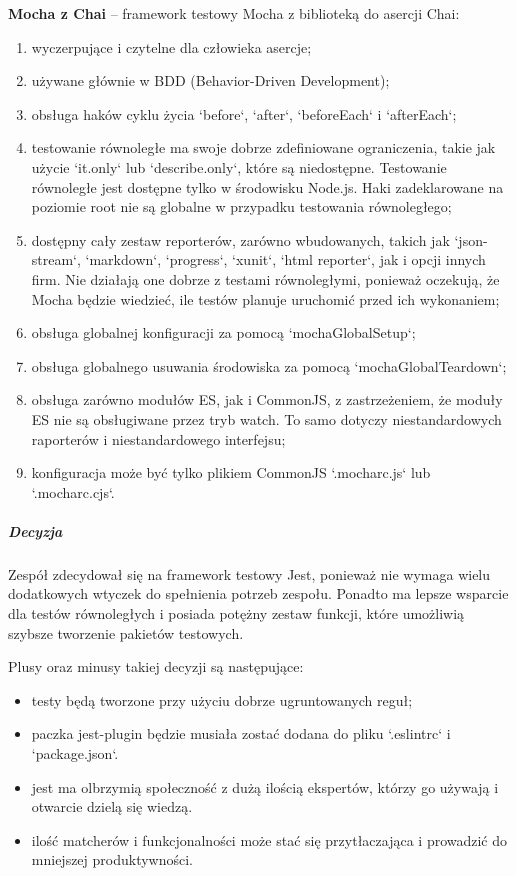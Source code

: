 \documentclass[12pt, a4paper, twoside, openany]{book}
\begin{document}
\textbf{Mocha z Chai} -- framework testowy Mocha z biblioteką do asercji Chai:
\begin{enumerate}[label=--]
    \item wyczerpujące i czytelne dla człowieka asercje;
    \item używane głównie w BDD (Behavior-Driven Development);
    \item obsługa haków cyklu życia `before`, `after`, `beforeEach` i `afterEach`;
    \item testowanie równoległe ma swoje dobrze zdefiniowane ograniczenia, takie jak użycie `it.only` lub `describe.only`, które są niedostępne. Testowanie równoległe jest dostępne tylko w środowisku Node.js. Haki zadeklarowane na poziomie root nie są globalne w przypadku testowania równoległego;
    \item dostępny cały zestaw reporterów, zarówno wbudowanych, takich jak `json-stream`, `markdown`, `progress`, `xunit`, `html reporter`, jak i opcji innych firm. Nie działają one dobrze z testami równoległymi, ponieważ oczekują, że Mocha będzie wiedzieć, ile testów planuje uruchomić przed ich wykonaniem;
    \item obsługa globalnej konfiguracji za pomocą `mochaGlobalSetup`;
    \item obsługa globalnego usuwania środowiska za pomocą `mochaGlobalTeardown`;
    \item obsługa zarówno modułów ES, jak i CommonJS, z zastrzeżeniem, że moduły ES nie są obsługiwane przez tryb watch. To samo dotyczy niestandardowych raporterów i niestandardowego interfejsu;
    \item konfiguracja może być tylko plikiem CommonJS `.mocharc.js` lub `.mocharc.cjs`.
\end{enumerate}

\subparagraph{Decyzja\\}

Zespół zdecydował się na framework testowy Jest, ponieważ nie wymaga wielu dodatkowych wtyczek do spełnienia potrzeb zespołu. Ponadto ma lepsze wsparcie dla testów równoległych i posiada potężny zestaw funkcji, które umożliwią szybsze tworzenie pakietów testowych.

Plusy oraz minusy takiej decyzji są następujące:
\begin{itemize}
    \item testy będą tworzone przy użyciu dobrze ugruntowanych reguł;
    \item paczka jest-plugin będzie musiała zostać dodana do pliku `.eslintrc` i `package.json`.
    \item jest ma olbrzymią społeczność z dużą ilością ekspertów, którzy go używają i otwarcie dzielą się wiedzą.
    \item ilość matcherów i funkcjonalności może stać się przytłaczająca i prowadzić do mniejszej produktywności.
\end{itemize}
\end{document}
